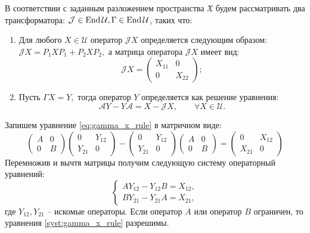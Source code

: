 В соответствии с заданным разложением пространства $\mathfrak{X}$ будем рассматривать два трансформатора: $\mathcal{J} \in \operatorname{End}\mathcal{U}, \Gamma \in \operatorname{End}\mathcal{U}$, таких что:
\begin{enumerate}
	\item Для любого $X \in \mathcal{U}$ оператор $\mathcal{J}X$ определяется следующим образом: $\mathcal{J}X = P_1XP_1 + P_2XP_2,$ а матрица оператора $\mathcal{J}X$ имеет вид:
	$$
	\mathcal{J}X = \begin{pmatrix}
		X_{11} & 0 \\
		0 & X_{22}
	\end{pmatrix};
	$$
	\item Пусть $\Gamma X = Y,$ тогда оператор $Y$ определяется как решение уравнения:
	\begin{equation}\label{eq:gamma_x_rule}
		\mathcal{A}Y - Y\mathcal{A} = X - \mathcal{J}X,\qquad \forall X \in \mathcal{U}.
	\end{equation}
\end{enumerate}
Запишем уравнение \ref{eq:gamma_x_rule} в матричном виде:
$$
\begin{pmatrix}
		A & 0 \\
		0 & B
\end{pmatrix}
\begin{pmatrix}
		0 & Y_{12} \\
		Y_{21} & 0
\end{pmatrix} -
\begin{pmatrix}
		0 & Y_{12} \\
		Y_{21} & 0
\end{pmatrix}
\begin{pmatrix}
		A & 0 \\
		0 & B
\end{pmatrix} =
\begin{pmatrix}
		0 & X_{12} \\
		X_{21} & 0
\end{pmatrix}	 	
$$
Перемножив и вычтя матрицы получим следующую систему операторный уравнений:
\begin{equation}\label{syst:gamma_x_rule}
	\begin{cases}
		AY_{12} - Y_{12}B = X_{12}, \\
		BY_{21} - Y_{21}A = X_{21},
	\end{cases}
\end{equation}
где $Y_{12}, Y_{21}$ -- искомые операторы. Если оператор $A$ или оператор $B$ ограничен, то уравнения \ref{syst:gamma_x_rule} разрешимы.

